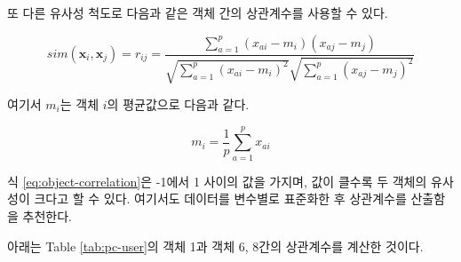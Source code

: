 \documentclass[]{book}
\newenvironment{Shaded}{\begin{snugshade}}{\end{snugshade}}
\newcommand{\DataTypeTok}[1]{\textcolor[rgb]{0.13,0.29,0.53}{#1}}
\newcommand{\DecValTok}[1]{\textcolor[rgb]{0.00,0.00,0.81}{#1}}
\newcommand{\KeywordTok}[1]{\textcolor[rgb]{0.13,0.29,0.53}{\textbf{#1}}}
\newcommand{\NormalTok}[1]{#1}
\newcommand{\OperatorTok}[1]{\textcolor[rgb]{0.81,0.36,0.00}{\textbf{#1}}}
\newcommand{\OtherTok}[1]{\textcolor[rgb]{0.56,0.35,0.01}{#1}}
\newcommand{\StringTok}[1]{\textcolor[rgb]{0.31,0.60,0.02}{#1}}
\begin{document}
또 다른 유사성 척도로 다음과 같은 객체 간의 상관계수를 사용할 수 있다.

\begin{equation}
sim(\mathbf{x}_i, \mathbf{x}_j) = r_{ij} = \frac{\sum_{a = 1}^{p} (x_{ai} - m_{i})(x_{aj} - m_{j})}{\sqrt{\sum_{a = 1}^{p} (x_{ai} - m_{i})^2} \sqrt{\sum_{a = 1}^{p} (x_{aj} - m_{j})^2}}
\label{eq:object-correlation}
\end{equation}

여기서 \(m_i\)는 객체 \(i\)의 평균값으로 다음과 같다.

\begin{equation*}
m_{i} = \frac{1}{p} \sum_{a = 1}^{p} x_{ai}
\end{equation*}

식 \eqref{eq:object-correlation}은 -1에서 1 사이의 값을 가지며, 값이 클수록 두 객체의 유사성이 크다고 할 수 있다. 여기서도 데이터를 변수별로 표준화한 후 상관계수를 산출함을 추천한다.

아래는 Table \ref{tab:pc-user}의 객체 1과 객체 6, 8간의 상관계수를 계산한 것이다.

\begin{Shaded}
\end{Shaded}
\end{document}
